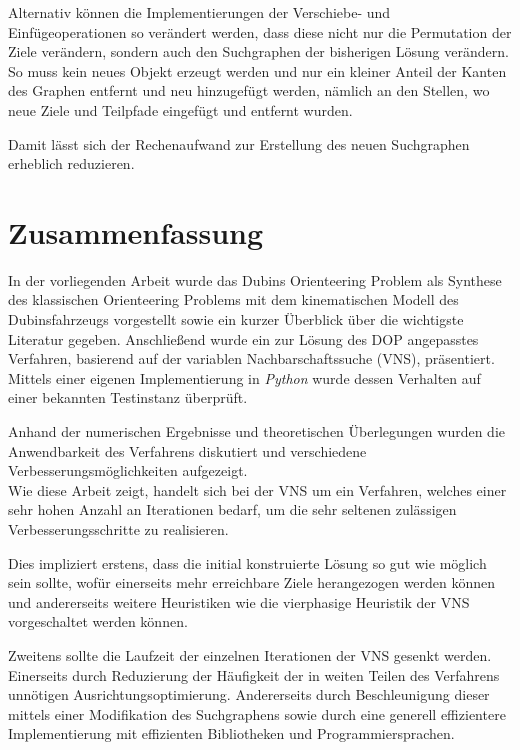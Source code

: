 \documentclass[12pt,a4paper,twoside]{article}
\theoremstyle{definition}
\numberwithin{equation}{section}
\begin{document}
Alternativ können die Implementierungen der Verschiebe- und Einfügeoperationen so verändert werden, dass diese nicht nur die Permutation der Ziele verändern, sondern auch den Suchgraphen der bisherigen Lösung verändern. So muss kein neues Objekt erzeugt werden und nur ein kleiner Anteil der Kanten des Graphen entfernt und neu hinzugefügt werden, nämlich an den Stellen, wo neue Ziele und Teilpfade eingefügt und entfernt wurden.

Damit lässt sich der Rechenaufwand zur Erstellung des neuen Suchgraphen erheblich reduzieren.

\newpage

\section{Zusammenfassung}\label{section:conclusion}
In der vorliegenden Arbeit wurde das Dubins Orienteering Problem als Synthese des klassischen Orienteering Problems mit dem kinematischen Modell des Dubinsfahrzeugs vorgestellt sowie ein kurzer Überblick über die wichtigste Literatur gegeben. Anschließend wurde ein zur Lösung des DOP angepasstes Verfahren, basierend auf der variablen Nachbarschaftssuche (VNS), präsentiert. Mittels einer eigenen Implementierung in \textit{Python} wurde dessen Verhalten auf einer bekannten Testinstanz überprüft.

Anhand der numerischen Ergebnisse und theoretischen Überlegungen wurden die Anwendbarkeit des Verfahrens diskutiert und verschiedene Verbesserungsmöglichkeiten aufgezeigt.\\

Wie diese Arbeit zeigt, handelt sich bei der VNS um ein Verfahren, welches einer sehr hohen Anzahl an Iterationen bedarf, um die sehr seltenen zulässigen Verbesserungsschritte zu realisieren.

Dies impliziert erstens, dass die initial konstruierte Lösung so gut wie möglich sein sollte, wofür einerseits mehr erreichbare Ziele herangezogen werden können und andererseits weitere Heuristiken wie die vierphasige Heuristik der VNS vorgeschaltet werden können.

Zweitens sollte die Laufzeit der einzelnen Iterationen der VNS gesenkt werden. Einerseits durch Reduzierung der Häufigkeit der in weiten Teilen des Verfahrens unnötigen Ausrichtungsoptimierung. Andererseits durch Beschleunigung dieser mittels einer Modifikation des Suchgraphens sowie durch eine generell effizientere Implementierung mit effizienten Bibliotheken und Programmiersprachen.
\end{document}
